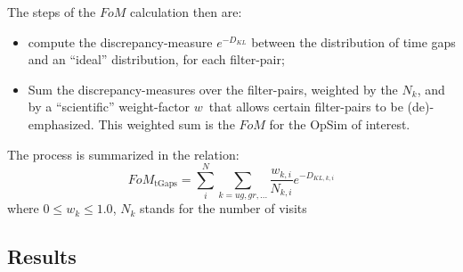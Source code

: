 The steps of the $FoM$ calculation then are:

\begin{itemize}
   
    \item compute the discrepancy-measure $e^{-D_{KL}}$ between the distribution of time gaps and an ``ideal'' distribution, for each filter-pair;
    \item Sum the discrepancy-measures over the filter-pairs, weighted by the  $N_k$, and by a ``scientific'' weight-factor $w$~that allows certain filter-pairs to be (de)-emphasized. This weighted sum is the $FoM$ for the OpSim of interest.
\end{itemize}

The process is summarized in the relation:
\begin{equation}
    FoM_\mathrm{tGaps} =\sum_i^N \sum_{k=ug, gr,...}\frac{w_{k,i}}{N_{k,i}} e^{-D_{KL,k,i}}
    \label{eq:fom:tgaps}
\end{equation}
where $0 \le w_k \le 1.0$, $N_k$ stands for the number of visits 


\subsection{Results}





